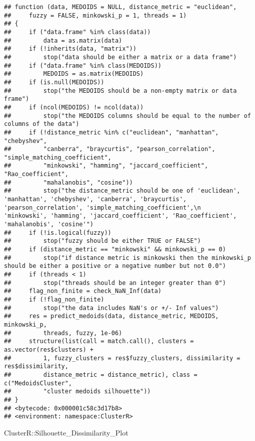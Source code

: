 \documentclass[
]{article}
\newenvironment{Shaded}{\begin{snugshade}}{\end{snugshade}}
\newcommand{\NormalTok}[1]{#1}
\newcommand{\SpecialCharTok}[1]{\textcolor[rgb]{0.00,0.00,0.00}{#1}}
\begin{document}
\begin{verbatim}
## function (data, MEDOIDS = NULL, distance_metric = "euclidean", 
##     fuzzy = FALSE, minkowski_p = 1, threads = 1) 
## {
##     if ("data.frame" %in% class(data)) 
##         data = as.matrix(data)
##     if (!inherits(data, "matrix")) 
##         stop("data should be either a matrix or a data frame")
##     if ("data.frame" %in% class(MEDOIDS)) 
##         MEDOIDS = as.matrix(MEDOIDS)
##     if (is.null(MEDOIDS)) 
##         stop("the MEDOIDS should be a non-empty matrix or data frame")
##     if (ncol(MEDOIDS) != ncol(data)) 
##         stop("the MEDOIDS columns should be equal to the number of columns of the data")
##     if (!distance_metric %in% c("euclidean", "manhattan", "chebyshev", 
##         "canberra", "braycurtis", "pearson_correlation", "simple_matching_coefficient", 
##         "minkowski", "hamming", "jaccard_coefficient", "Rao_coefficient", 
##         "mahalanobis", "cosine")) 
##         stop("the distance_metric should be one of 'euclidean', 'manhattan', 'chebyshev', 'canberra', 'braycurtis', 'pearson_correlation', 'simple_matching_coefficient',\n         'minkowski', 'hamming', 'jaccard_coefficient', 'Rao_coefficient', 'mahalanobis', 'cosine'")
##     if (!is.logical(fuzzy)) 
##         stop("fuzzy should be either TRUE or FALSE")
##     if (distance_metric == "minkowski" && minkowski_p == 0) 
##         stop("if distance metric is minkowski then the minkowski_p should be either a positive or a negative number but not 0.0")
##     if (threads < 1) 
##         stop("threads should be an integer greater than 0")
##     flag_non_finite = check_NaN_Inf(data)
##     if (!flag_non_finite) 
##         stop("the data includes NaN's or +/- Inf values")
##     res = predict_medoids(data, distance_metric, MEDOIDS, minkowski_p, 
##         threads, fuzzy, 1e-06)
##     structure(list(call = match.call(), clusters = as.vector(res$clusters) + 
##         1, fuzzy_clusters = res$fuzzy_clusters, dissimilarity = res$dissimilarity, 
##         distance_metric = distance_metric), class = c("MedoidsCluster", 
##         "cluster medoids silhouette"))
## }
## <bytecode: 0x000001c58c3d17b8>
## <environment: namespace:ClusterR>
\end{verbatim}

\begin{Shaded}
\begin{Highlighting}[]
\NormalTok{ClusterR}\SpecialCharTok{::}\NormalTok{Silhouette\_Dissimilarity\_Plot}
\end{Highlighting}
\end{Shaded}
\end{document}
